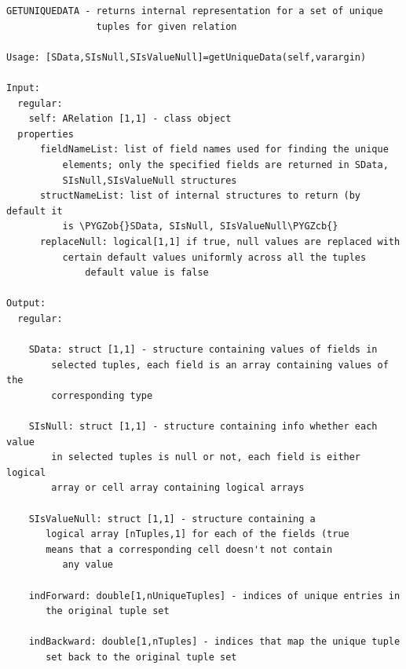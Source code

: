 \documentclass[letterpaper,10pt,english]{sphinxmanual}
\def\PYGZob{\char`\{}
\def\PYGZcb{\char`\}}
\begin{document}
\begin{Verbatim}[commandchars=\\\{\}]
GETUNIQUEDATA - returns internal representation for a set of unique
                tuples for given relation

Usage: [SData,SIsNull,SIsValueNull]=getUniqueData(self,varargin)

Input:
  regular:
    self: ARelation [1,1] - class object
  properties
      fieldNameList: list of field names used for finding the unique
          elements; only the specified fields are returned in SData,
          SIsNull,SIsValueNull structures
      structNameList: list of internal structures to return (by default it
          is \PYGZob{}SData, SIsNull, SIsValueNull\PYGZcb{}
      replaceNull: logical[1,1] if true, null values are replaced with
          certain default values uniformly across all the tuples
              default value is false

Output:
  regular:

    SData: struct [1,1] - structure containing values of fields in
        selected tuples, each field is an array containing values of the
        corresponding type

    SIsNull: struct [1,1] - structure containing info whether each value
        in selected tuples is null or not, each field is either logical
        array or cell array containing logical arrays

    SIsValueNull: struct [1,1] - structure containing a
       logical array [nTuples,1] for each of the fields (true
       means that a corresponding cell doesn't not contain
          any value

    indForward: double[1,nUniqueTuples] - indices of unique entries in
       the original tuple set

    indBackward: double[1,nTuples] - indices that map the unique tuple
       set back to the original tuple set
\end{Verbatim}
\end{document}
